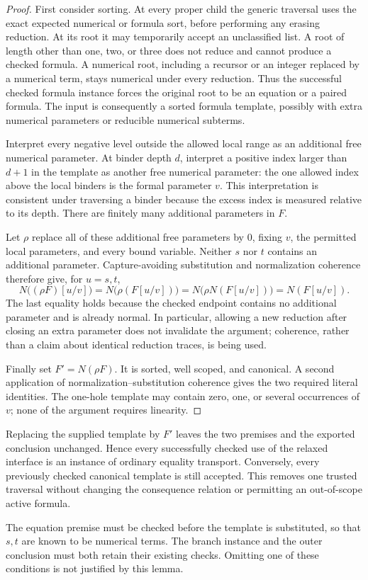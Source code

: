 \begin{proof}
First consider sorting.  At every proper child the generic traversal
uses the exact expected numerical or formula sort, before performing
any erasing reduction.  At its root it may temporarily accept an
unclassified list.  A root of length other than one, two, or three
does not reduce and cannot produce a checked formula.  A numerical
root, including a recursor or an integer replaced by a numerical term,
stays numerical under every reduction.  Thus the successful checked
formula instance forces the original root to be an equation or a paired
formula.  The input is consequently a sorted formula template, possibly
with extra numerical parameters or reducible numerical subterms.

Interpret every negative level outside the allowed local range as an
additional free numerical parameter.  At binder depth $d$, interpret a
positive index larger than $d+1$ in the template as another free numerical
parameter: the one allowed index above the local binders is the formal
parameter $v$.  This interpretation is consistent under traversing a
binder because the excess index is measured relative to its depth.
There are finitely many additional parameters in $F$.

Let $\rho$ replace all of these additional free parameters by $0$, fixing
$v$, the permitted local parameters, and every bound variable.  Neither
$s$ nor $t$ contains an additional parameter.  Capture-avoiding
substitution and normalization coherence therefore give, for $u=s,t$,
\[
 N\bigl((\rho F)[u/v]\bigr)
   =N\bigl(\rho(F[u/v])\bigr)
   =N\bigl(\rho N(F[u/v])\bigr)
   =N(F[u/v]).
\]
The last equality holds because the checked endpoint contains no
additional parameter and is already normal.  In particular, allowing a
new reduction after closing an extra parameter does not invalidate the
argument; coherence, rather than a claim about identical reduction
traces, is being used.

Finally set $F'=N(\rho F)$.  It is sorted, well scoped, and canonical.
A second application of normalization--substitution coherence gives the
two required literal identities.  The one-hole template may contain
zero, one, or several occurrences of $v$; none of the argument requires
linearity.
\end{proof}

Replacing the supplied template by $F'$ leaves the two premises and the
exported conclusion unchanged.  Hence every successfully checked use of
the relaxed interface is an instance of ordinary equality transport.
Conversely, every previously checked canonical template is still accepted.
This removes one trusted traversal without changing the consequence
relation or permitting an out-of-scope active formula.

The equation premise must be checked before the template is substituted,
so that $s,t$ are known to be numerical terms.  The branch instance and
the outer conclusion must both retain their existing checks.  Omitting
one of these conditions is not justified by this lemma.
